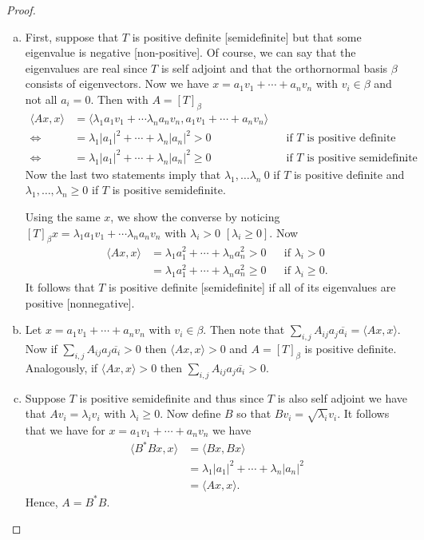 \documentclass[leqno]{article}
\theoremstyle{nonumberplain}
\newtheorem{proof}{Proof}
\begin{document}
\begin{proof}~

\begin{enumerate}[(a)]
\item First, suppose that $T$ is positive definite [semidefinite] but that some eigenvalue is negative [non-positive].  Of course, we can say that the eigenvalues are real since $T$ is self adjoint and that the orthornormal basis $\beta$ consists of eigenvectors.  Now we have $x=a_1 v_1 + \cdots + a_n v_n$ with $v_i \in \beta$ and not all $a_i=0$. Then with $A=[T]_\beta$
\begin{align*}
\langle A x,x \rangle &= \langle \lambda_1 a_1 v_1 + \cdots \lambda_n a_n v_n , a_1 v_1 + \cdots + a_n v_n \rangle\\
\iff&= \lambda_1 |a_1|^2 + \cdots + \lambda_n |a_n|^2 > 0 &&\textrm{if $T$ is positive definite}\\
\iff&=  \lambda_1 |a_1|^2 + \cdots + \lambda_n |a_n|^2 \geq 0 &&\textrm{if $T$ is positive semidefinite}.
\end{align*}
Now the last two statements imply that $\lambda_1,\dots \lambda_n\>0$ if $T$ is positive definite and $\lambda_1,\dots,\lambda_n\geq 0$ if $T$ is positive semidefinite. 

Using the same $x$, we show the converse by noticing $[T]_\beta x=\lambda_1 a_1 v_1 + \cdots \lambda_n a_n v_n$ with $\lambda_i >0$ $[\lambda_i\geq 0]$. Now
\begin{align*}
\langle A x,x\rangle &= \lambda_1 a_1^2 +\cdots +\lambda_n a_n^2 >0 && \textrm{if $\lambda_i >0$}\\
&= \lambda_1 a_1^2 +\cdots +\lambda_n a_n^2 \geq0 && \textrm{if $\lambda_i \geq0$}.
\end{align*}
It follows that $T$ is positive definite [semidefinite] if all of its eigenvalues are positive [nonnegative].

\item Let $x=a_1 v_1+\cdots + a_n v_n$ with $v_i\in \beta$.  Then note that $\sum_{i,j} A_{ij} a_j \overline{a_i} = \langle Ax,x \rangle$. Now if $\sum_{i,j} A_{ij} a_j \overline{a_i}>0$ then $\langle Ax,x \rangle >0$ and $A=[T]_\beta$ is positive definite. Analogously, if $\langle Ax,x \rangle >0$ then $\sum_{i,j} A_{ij} a_j \overline{a_i}>0$. 

\item Suppose $T$ is positive semidefinite and thus since $T$ is also self adjoint we have that $Av_i=\lambda_i v_i$ with $\lambda_i\geq0$.  Now define $B$ so that $Bv_i=\sqrt{\lambda_i}v_i$. It follows that we have for $x=a_1 v_1 + \cdots + a_n v_n$ we have\begin{align*}
\langle B^* Bx, x \rangle &= \langle Bx, Bx \rangle\\
&= \lambda_1 |a_1|^2 + \cdots + \lambda_n |a_n|^2\\
&= \langle Ax,x \rangle.
\end{align*} 
Hence, $A=B^*B$.


\end{enumerate}
\end{proof}
\end{document}
